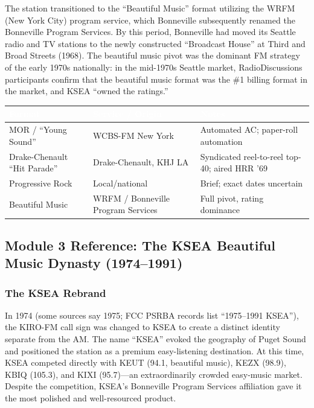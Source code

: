 \documentclass[11pt,letterpaper]{article}
\newcommand{\tableheader}[1]{\textbf{\sffamily\textcolor{white}{#1}}}
\begin{document}
The station transitioned to the ``Beautiful Music'' format utilizing the WRFM (New York City) program service, which Bonneville subsequently renamed the Bonneville Program Services. By this period, Bonneville had moved its Seattle radio and TV stations to the newly constructed ``Broadcast House'' at Third and Broad Streets (1968). The beautiful music pivot was the dominant FM strategy of the early 1970s nationally: in the mid-1970s Seattle market, RadioDiscussions participants confirm that the beautiful music format was the \#1 billing format in the market, and KSEA ``owned the ratings.''

\begin{center}
\begin{tabularx}{\textwidth}{L{3cm}L{3.5cm}X}
\toprule
{}
\tableheader{Format} & \tableheader{Service / Origin} & \tableheader{Notes} \\
\midrule
MOR / ``Young Sound'' & WCBS-FM New York & Automated AC; paper-roll automation \\
Drake-Chenault ``Hit Parade'' & Drake-Chenault, KHJ LA & Syndicated reel-to-reel top-40; aired HRR '69 \\
Progressive Rock & Local/national & Brief; exact dates uncertain \\
Beautiful Music & WRFM / Bonneville Program Services & Full pivot, rating dominance \\
\bottomrule
\end{tabularx}
\end{center}

\subsection{Module 3 Reference: The KSEA Beautiful Music Dynasty (1974--1991)}

\subsubsection{The KSEA Rebrand}

In 1974 (some sources say 1975; FCC PSRBA records list ``1975--1991 KSEA''), the KIRO-FM call sign was changed to KSEA to create a distinct identity separate from the AM. The name ``KSEA'' evoked the geography of Puget Sound and positioned the station as a premium easy-listening destination. At this time, KSEA competed directly with KEUT (94.1, beautiful music), KEZX (98.9), KBIQ (105.3), and KIXI (95.7)---an extraordinarily crowded easy-music market. Despite the competition, KSEA's Bonneville Program Services affiliation gave it the most polished and well-resourced product.
\end{document}
